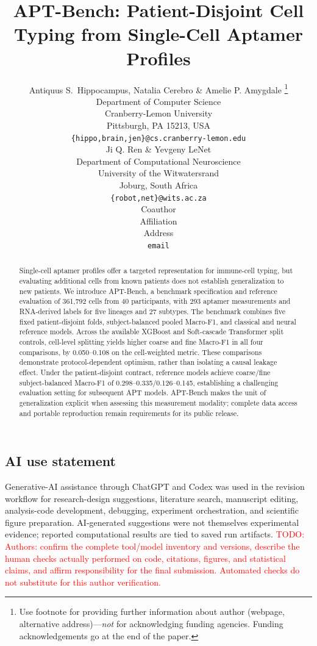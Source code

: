 \documentclass{article} %
\title{APT-Bench: Patient-Disjoint Cell Typing from \mbox{Single-Cell} Aptamer Profiles}
\author{Antiquus S.~Hippocampus, Natalia Cerebro \& Amelie P. Amygdale \thanks{ Use footnote for providing further information
about author (webpage, alternative address)---\emph{not} for acknowledging
funding agencies.  Funding acknowledgements go at the end of the paper.} \\
Department of Computer Science\\
Cranberry-Lemon University\\
Pittsburgh, PA 15213, USA \\
\texttt{\{hippo,brain,jen\}@cs.cranberry-lemon.edu} \\
\And
Ji Q. Ren \& Yevgeny LeNet \\
Department of Computational Neuroscience \\
University of the Witwatersrand \\
Joburg, South Africa \\
\texttt{\{robot,net\}@wits.ac.za} \\
\AND
Coauthor \\
Affiliation \\
Address \\
\texttt{email}
}
\newcommand{\todo}[1]{\textcolor{red}{TODO: #1}}
\begin{document}
\raggedbottom


\maketitle

\begin{abstract}
Single-cell aptamer profiles offer a targeted representation for immune-cell
typing, but evaluating additional cells from known patients does not establish
generalization to new patients. We introduce APT-Bench, a benchmark
specification and reference evaluation of 361{,}792 cells from 40 participants,
with 293 aptamer measurements and RNA-derived labels for five lineages and
27 subtypes. The benchmark combines five fixed patient-disjoint folds,
subject-balanced pooled Macro-F1, and classical and neural reference models.
Across the available XGBoost and Soft-cascade Transformer split controls,
cell-level splitting yields higher coarse and fine Macro-F1 in all four
comparisons, by 0.050--0.108 on the cell-weighted metric. These comparisons
demonstrate protocol-dependent optimism, rather than isolating a causal
leakage effect. Under the patient-disjoint contract, reference models achieve
coarse/fine subject-balanced Macro-F1 of 0.298--0.335/0.126--0.145,
establishing a challenging evaluation setting for subsequent APT models.
APT-Bench makes the unit of generalization explicit when assessing this
measurement modality; complete data access and portable reproduction remain
requirements for its public release.
\end{abstract}














\subsection*{AI use statement}

Generative-AI assistance through ChatGPT and Codex was used in the revision
workflow for research-design suggestions, literature search, manuscript editing,
analysis-code development, debugging, experiment orchestration, and scientific
figure preparation. AI-generated suggestions were not themselves experimental
evidence; reported computational results are tied to saved run artifacts.
\todo{Authors: confirm the complete tool/model inventory and versions, describe
the human checks actually performed on code, citations, figures, and statistical
claims, and affirm responsibility for the final submission. Automated checks
do not substitute for this author verification.}
\end{document}

